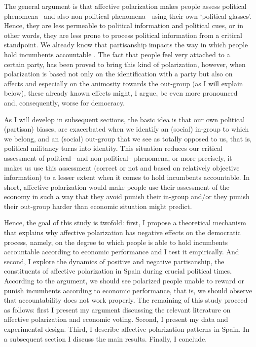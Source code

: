 \documentclass[a4paper, svgnames]{article}
\begin{document}
The general argument is that affective polarization makes people assess political phenomena --and also non-political phenomena-- using their own `political glasses'. Hence, they are less permeable to political information and political cues, or in other words, they are less prone to process political information from a critical standpoint. We already know that partisanship impacts the way in which people hold incumbents accountable \citet*{tilleyGovernmentBlameExperimental2011a}. The fact that people feel very attached to a certain party, has been proved to bring this kind of polarization, however, when polarization is based not only on the identification with a party but also on affects and especially on the animosity towards the out-group (as I will explain below), these already known effects might, I argue, be even more pronounced and, consequently, worse for democracy.

As I will develop in subsequent sections, the basic idea is that our own political (partisan) biases, are exacerbated when we identify an (social) in-group to which we belong, and an (social) out-group that we see as totally opposed to us, that is, political militancy turns into identity. This situation reduces our critical assessment of political --and non-political-- phenomena, or more precisely, it makes us use this assessment (correct or not and based on relatively objective information) to a lesser extent when it comes to hold incumbents accountable. In short, affective polarization would make people use their assessment of the economy in such a way that they avoid punish their in-group and/or they punish their out-group harder than economic situation might predict.

Hence, the goal of this study is twofold: first, I propose a theoretical mechanism that explains why affective polarization has negative effects on the democratic process, namely, on the degree to which people is able to hold incumbents accountable according to economic performance and I test it empirically. And second, I explore the dynamics of positive and negative partisanship, the constituents of affective polarization in Spain during crucial political times. According to the argument, we should see polarized people unable to reward or punish incumbents according to economic performance, that is, we should observe that accountability does not work properly. The remaining of this study proceed as follows: first I present my argument discussing the relevant literature on affective polarization and economic voting. Second, I present my data and experimental design. Third, I describe affective polarization patterns in Spain. In a subsequent section I discuss the main results. Finally, I conclude.
\end{document}
